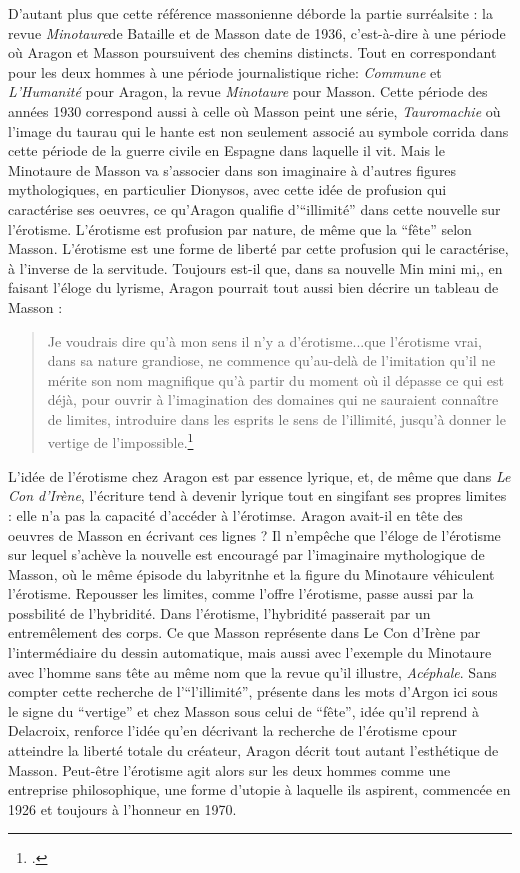 	 D'autant plus que cette référence massonienne déborde la partie surréalsite : la revue \emph{Minotaure}de Bataille et de Masson date de 1936, c'est-à-dire à une période où Aragon et Masson poursuivent des chemins distincts. Tout en correspondant pour les deux hommes à une période journalistique riche: \emph{Commune} et \emph{L'Humanité} pour Aragon, la revue \emph{Minotaure} pour Masson. Cette période des années 1930 correspond aussi à celle où Masson peint une série, \emph{Tauromachie} où l'image du taurau qui le hante est non seulement associé au symbole  corrida dans cette période de la guerre civile en Espagne dans laquelle il vit. Mais le Minotaure de Masson va s'associer dans son imaginaire à d'autres figures mythologiques, en particulier Dionysos, avec cette idée de profusion qui caractérise ses oeuvres, ce qu'Aragon qualifie d'\enquote{illimité} dans cette nouvelle sur l'érotisme. L'érotisme est profusion par nature, de même que la \enquote{fête} selon Masson. L'érotisme est une forme de liberté par cette profusion qui le caractérise, à l'inverse de la servitude. Toujours est-il que, dans sa nouvelle {Min mini mi,}, en faisant l'éloge du lyrisme, Aragon pourrait tout aussi bien décrire un tableau de Masson : 

\begin{quote}
Je voudrais dire qu'à mon sens il n'y a d'érotisme...que l'érotisme vrai, dans sa nature grandiose, ne commence qu'au-delà de l'imitation qu'il ne mérite son nom magnifique qu'à partir du moment où il dépasse ce qui est déjà, pour ouvrir à l'imagination des domaines qui ne sauraient connaître de limites, introduire dans les esprits le sens de l'illimité, jusqu'à donner le vertige de l'impossible.\footcite[p496]{mentirvrai}\end{quote}

L'idée de l'érotisme chez Aragon est par essence lyrique, et, de même que dans \emph{Le Con d'Irène}, l'écriture tend à devenir lyrique tout en singifant ses propres limites : elle n'a pas la capacité d'accéder à l'érotimse. Aragon avait-il en tête des oeuvres de Masson en écrivant ces lignes ? Il n'empêche que l'éloge de l'érotisme sur lequel s'achève la nouvelle est encouragé par l'imaginaire mythologique de Masson, où le même épisode du labyritnhe et la figure du Minotaure véhiculent l'érotisme. Repousser les limites, comme l'offre l'érotisme, passe aussi par la possbilité de l'hybridité. Dans l'érotisme, l'hybridité passerait par un entremêlement des corps. Ce que Masson représente dans Le Con d'Irène par l'intermédiaire du dessin automatique, mais aussi avec l'exemple du Minotaure avec l'homme sans tête au même nom que la revue qu'il illustre, \emph{Acéphale}. Sans compter cette recherche de l'\enquote{l'illimité}, présente dans les mots d'Argon ici sous le signe du \enquote{vertige} et chez Masson sous celui de \enquote{fête}, idée qu'il reprend à Delacroix, renforce l'idée qu'en décrivant la recherche de l'érotisme cpour atteindre la liberté totale du créateur, Aragon décrit tout autant l'esthétique de Masson. Peut-être l'érotisme agit alors sur les deux hommes comme une entreprise philosophique, une forme d'utopie à laquelle ils aspirent, commencée en 1926 et toujours à l'honneur en 1970. 

